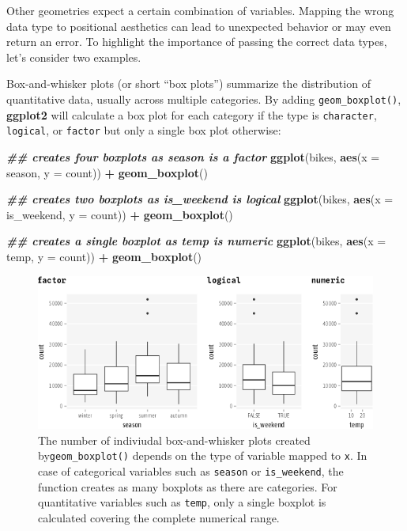 \documentclass[
]{krantz}
\makeatletter
\newenvironment{Shaded}{\begin{snugshade}}{\end{snugshade}}
\newcommand{\AttributeTok}[1]{\textcolor[rgb]{0.27,0.27,0.27}{#1}}
\newcommand{\DocumentationTok}[1]{\textcolor[rgb]{0.37,0.37,0.37}{\textbf{\textit{#1}}}}
\newcommand{\FunctionTok}[1]{\textcolor[rgb]{0.27,0.27,0.27}{\textbf{#1}}}
\newcommand{\NormalTok}[1]{#1}
\newcommand{\SpecialCharTok}[1]{\textcolor[rgb]{0.43,0.43,0.43}{\textbf{#1}}}
\newenvironment{kframe}{%
\medskip{}
\setlength{\fboxsep}{.8em}
 \def\at@end@of@kframe{}%
 \ifinner\ifhmode%
  \def\at@end@of@kframe{\end{minipage}}%
  \begin{minipage}{\columnwidth}%
 \fi\fi%
 \def\FrameCommand##1{\hskip\@totalleftmargin \hskip-\fboxsep
 \colorbox{shadecolor}{##1}\hskip-\fboxsep
     \hskip-\linewidth \hskip-\@totalleftmargin \hskip\columnwidth}%
 \MakeFramed {\advance\hsize-\width
   \@totalleftmargin\z@ \linewidth\hsize
   \@setminipage}}%
 {\par\unskip\endMakeFramed%
 \at@end@of@kframe}
\renewenvironment{Shaded}{\begin{kframe}}{\end{kframe}}
\makeatother
\begin{document}
Other geometries expect a certain combination of variables. Mapping the wrong data type to positional aesthetics can lead to unexpected behavior or may even return an error. To highlight the importance of passing the correct data types, let's consider two examples.

Box-and-whisker plots (or short ``box plots'') summarize the distribution of quantitative data, usually across multiple categories. By adding \texttt{geom\_boxplot()}, \textbf{ggplot2} will calculate a box plot for each category if the type is \texttt{character}, \texttt{logical}, or \texttt{factor} but only a single box plot otherwise:

\begin{Shaded}
\begin{Highlighting}[]
\DocumentationTok{\#\# creates four boxplots as \textasciigrave{}season\textasciigrave{} is a factor}
\FunctionTok{ggplot}\NormalTok{(bikes, }\FunctionTok{aes}\NormalTok{(}\AttributeTok{x =}\NormalTok{ season, }\AttributeTok{y =}\NormalTok{ count)) }\SpecialCharTok{+} \FunctionTok{geom\_boxplot}\NormalTok{()}

\DocumentationTok{\#\# creates two boxplots as \textasciigrave{}is\_weekend\textasciigrave{} is logical}
\FunctionTok{ggplot}\NormalTok{(bikes, }\FunctionTok{aes}\NormalTok{(}\AttributeTok{x =}\NormalTok{ is\_weekend, }\AttributeTok{y =}\NormalTok{ count)) }\SpecialCharTok{+} \FunctionTok{geom\_boxplot}\NormalTok{()}

\DocumentationTok{\#\# creates a single boxplot as \textasciigrave{}temp\textasciigrave{} is numeric}
\FunctionTok{ggplot}\NormalTok{(bikes, }\FunctionTok{aes}\NormalTok{(}\AttributeTok{x =}\NormalTok{ temp, }\AttributeTok{y =}\NormalTok{ count)) }\SpecialCharTok{+} \FunctionTok{geom\_boxplot}\NormalTok{()}
\end{Highlighting}
\end{Shaded}

\begin{figure}
\centering
\includegraphics{bookdown_files/figure-latex/07layerTypeBoxplot-1.png}
\caption{\label{fig:07layerTypeBoxplot}The number of indiviudal box-and-whisker plots created by\texttt{geom\_boxplot()} depends on the type of variable mapped to \texttt{x}. In case of categorical variables such as \texttt{season} or \texttt{is\_weekend}, the function creates as many boxplots as there are categories. For quantitative variables such as \texttt{temp}, only a single boxplot is calculated covering the complete numerical range.}
\end{figure}
\end{document}
